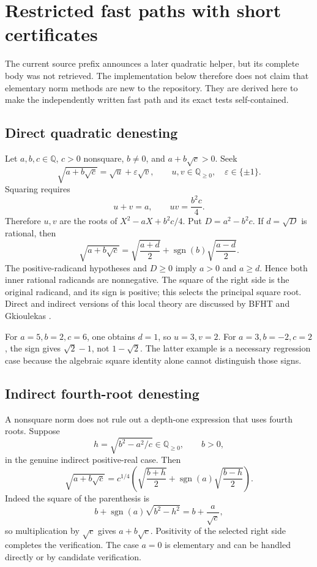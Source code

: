 \documentclass[11pt,letterpaper]{article}
\numberwithin{equation}{section}
\theoremstyle{definition}\newtheorem{definition}[theorem]{Definition}
\theoremstyle{remark}\newtheorem{remark}[theorem]{Remark}
\newcommand{\Q}{\mathbb Q}\newcommand{\C}{\mathbb C}\newcommand{\R}{\mathbb R}\newcommand{\Z}{\mathbb Z}
\newcommand{\sgn}{\operatorname{sgn}}
\begin{document}
\section{Restricted fast paths with short certificates}
\label{sec:fastpaths}
The current source prefix announces a later quadratic helper, but its complete body was not retrieved. The implementation below therefore does not claim that elementary norm methods are new to the repository. They are derived here to make the independently written fast path and its exact tests self-contained.

\subsection{Direct quadratic denesting}
Let $a,b,c\in\Q$, $c>0$ nonsquare, $b\ne0$, and $a+b\sqrt c>0$. Seek
\[
 \sqrt{a+b\sqrt c}=\sqrt u+\varepsilon\sqrt v,
 \qquad u,v\in\Q_{\ge0},\quad\varepsilon\in\{\pm1\}.
\]
Squaring requires
\[
 u+v=a,\qquad uv=\frac{b^2c}{4}.
\]
Therefore $u,v$ are the roots of $X^2-aX+b^2c/4$. Put $D=a^2-b^2c$. If $d=\sqrt D$ is rational, then
\begin{equation}\label{eq:direct}
 \sqrt{a+b\sqrt c}=
 \sqrt{\frac{a+d}{2}}+\sgn(b)\sqrt{\frac{a-d}{2}}.
\end{equation}
The positive-radicand hypotheses and $D\ge0$ imply $a>0$ and $a\ge d$. Hence both inner rational radicands are nonnegative. The square of the right side is the original radicand, and its sign is positive; this selects the principal square root. Direct and indirect versions of this local theory are discussed by BFHT and Gkioulekas \cite{bfht,gkioulekas}.

For $a=5,b=2,c=6$, one obtains $d=1$, so $u=3,v=2$. For $a=3,b=-2,c=2$, the sign gives $\sqrt2-1$, not $1-\sqrt2$. The latter example is a necessary regression case because the algebraic square identity alone cannot distinguish those signs.

\subsection{Indirect fourth-root denesting}
A nonsquare norm does not rule out a depth-one expression that uses fourth roots. Suppose
\[
 h=\sqrt{b^2-a^2/c}\in\Q_{\ge0},\qquad b>0,
\]
in the genuine indirect positive-real case. Then
\begin{equation}\label{eq:indirect}
 \sqrt{a+b\sqrt c}=c^{1/4}
 \left(\sqrt{\frac{b+h}{2}}+\sgn(a)\sqrt{\frac{b-h}{2}}\right).
\end{equation}
Indeed the square of the parenthesis is
\[
 b+\sgn(a)\sqrt{b^2-h^2}=b+\frac{a}{\sqrt c},
\]
so multiplication by $\sqrt c$ gives $a+b\sqrt c$. Positivity of the selected right side completes the verification. The case $a=0$ is elementary and can be handled directly or by candidate verification.
\end{document}

